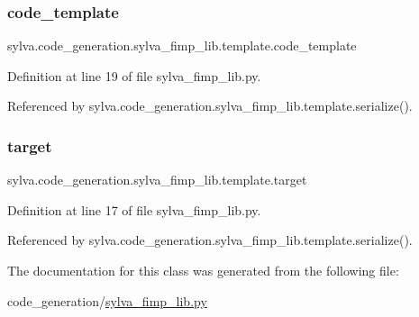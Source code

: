 \subsubsection{\texorpdfstring{code\+\_\+template}{code\_template}}
{\footnotesize\ttfamily sylva.\+code\+\_\+generation.\+sylva\+\_\+fimp\+\_\+lib.\+template.\+code\+\_\+template}



Definition at line 19 of file sylva\+\_\+fimp\+\_\+lib.\+py.



Referenced by sylva.\+code\+\_\+generation.\+sylva\+\_\+fimp\+\_\+lib.\+template.\+serialize().

\mbox{\label{classsylva_1_1code__generation_1_1sylva__fimp__lib_1_1template_a406dc0282db6a1ae647d7b4ff3f21cd5}} 
\subsubsection{\texorpdfstring{target}{target}}
{\footnotesize\ttfamily sylva.\+code\+\_\+generation.\+sylva\+\_\+fimp\+\_\+lib.\+template.\+target}



Definition at line 17 of file sylva\+\_\+fimp\+\_\+lib.\+py.



Referenced by sylva.\+code\+\_\+generation.\+sylva\+\_\+fimp\+\_\+lib.\+template.\+serialize().



The documentation for this class was generated from the following file\+:\begin{DoxyCompactItemize}
\item 
code\+\_\+generation/\hyperlink{sylva__fimp__lib_8py}{sylva\+\_\+fimp\+\_\+lib.\+py}\end{DoxyCompactItemize}

